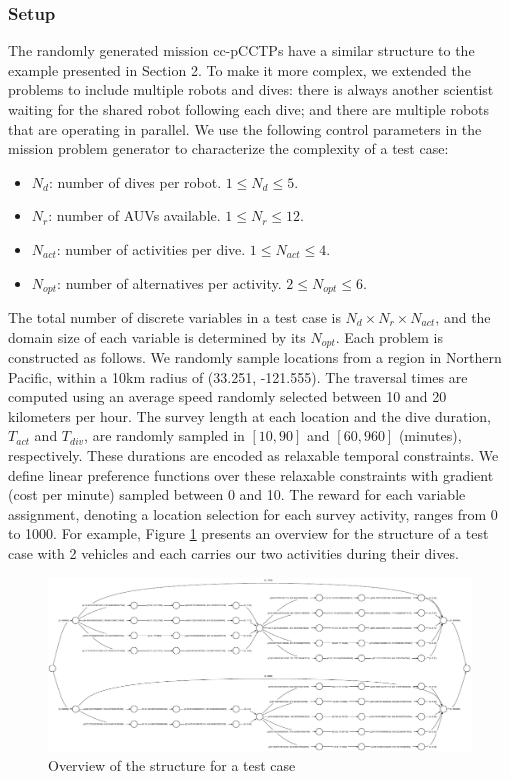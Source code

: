 \documentclass[jair,twoside,11pt,theapa]{article}
\begin{document}
\subsubsection{Setup}


The randomly generated mission cc-pCCTPs have a similar structure to the example
presented in Section 2. To make it more complex, we extended the problems to
include multiple robots and dives: there is always another scientist waiting for
the shared robot following each dive; and there are multiple robots that are
operating in parallel. We use the following control parameters in the mission
problem generator to characterize the complexity of a test case:


\begin{itemize}
	\item $N_d$: number of dives per robot. $1\leq N_d\leq 5$.
	\item $N_r$: number of AUVs available. $1\leq N_r\leq 12$.
	\item $N_{act}$: number of activities per dive. $1\leq N_{act}\leq 4$.
	\item $N_{opt}$: number of alternatives per activity. $2\leq N_{opt}\leq 6$.
\end{itemize}


The total number of discrete variables in a test case is $N_d\times N_r\times
N_{act}$, and the domain size of each variable is determined by its $N_{opt}$.
Each problem is constructed as follows. We randomly sample locations from a
region in Northern Pacific, within a 10km radius of (33.251, -121.555). The
traversal times are computed using an average speed randomly selected between 10
and 20 kilometers per hour. The survey length at each location and the dive
duration, $T_{act}$ and $T_{div}$, are randomly sampled in $[10,90]$ and
$[60,960]$ (minutes), respectively. These durations are encoded as relaxable
temporal constraints. We define linear preference functions over these relaxable
constraints with gradient (cost per minute) sampled between 0 and 10. The reward
for each variable assignment, denoting a location selection for each survey
activity, ranges from 0 to 1000. For example, Figure \ref{fig:test_case_auv}
presents an overview for the structure of a test case with 2 vehicles and each
carries our two activities during their dives.


\begin{figure}[htb]
	\centering
	\includegraphics[width=1.0\textwidth]{figures/test_case_auv.pdf}
	\caption{Overview of the structure for a test case}
	\label{fig:test_case_auv}
\end{figure}
\end{document}
